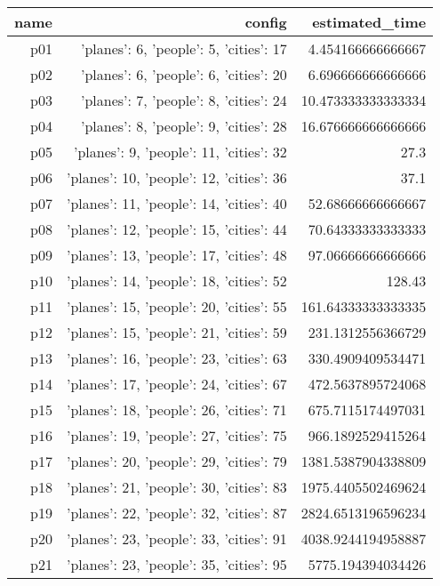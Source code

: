 \documentclass{article}
\begin{document}
                            \begin{center}
                            \scriptsize
                            \begin{tabular}{r|r|r}
                            name & config & estimated\_time\\\midrule
                              p01&{'planes': 6, 'people': 5, 'cities': 17}&4.454166666666667\\
  p02&{'planes': 6, 'people': 6, 'cities': 20}&6.696666666666666\\
  p03&{'planes': 7, 'people': 8, 'cities': 24}&10.473333333333334\\
  p04&{'planes': 8, 'people': 9, 'cities': 28}&16.676666666666666\\
  p05&{'planes': 9, 'people': 11, 'cities': 32}&27.3\\
  p06&{'planes': 10, 'people': 12, 'cities': 36}&37.1\\
  p07&{'planes': 11, 'people': 14, 'cities': 40}&52.68666666666667\\
  p08&{'planes': 12, 'people': 15, 'cities': 44}&70.64333333333333\\
  p09&{'planes': 13, 'people': 17, 'cities': 48}&97.06666666666666\\
  p10&{'planes': 14, 'people': 18, 'cities': 52}&128.43\\
  p11&{'planes': 15, 'people': 20, 'cities': 55}&161.64333333333335\\
  p12&{'planes': 15, 'people': 21, 'cities': 59}&231.1312556366729\\
  p13&{'planes': 16, 'people': 23, 'cities': 63}&330.4909409534471\\
  p14&{'planes': 17, 'people': 24, 'cities': 67}&472.5637895724068\\
  p15&{'planes': 18, 'people': 26, 'cities': 71}&675.7115174497031\\
  p16&{'planes': 19, 'people': 27, 'cities': 75}&966.1892529415264\\
  p17&{'planes': 20, 'people': 29, 'cities': 79}&1381.5387904338809\\
  p18&{'planes': 21, 'people': 30, 'cities': 83}&1975.4405502469624\\
  p19&{'planes': 22, 'people': 32, 'cities': 87}&2824.6513196596234\\
  p20&{'planes': 23, 'people': 33, 'cities': 91}&4038.9244194958887\\
  p21&{'planes': 23, 'people': 35, 'cities': 95}&5775.194394034426\\

\end{tabular}
\end{center}
\end{document}
